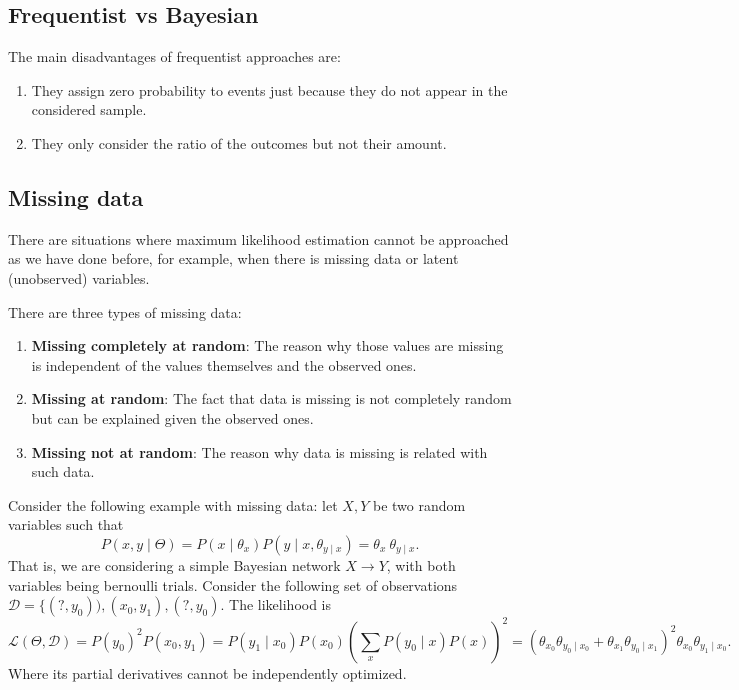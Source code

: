 \documentclass[11pt]{article}
\theoremstyle{definition}
\begin{document}
\subsection{Frequentist vs Bayesian}

The main disadvantages of frequentist approaches are:
\begin{enumerate}
  \item They assign zero probability to events just because they do not appear in the considered sample.
  \item They only consider the ratio of the outcomes but not their amount.
\end{enumerate}

\subsection{Missing data}

There are situations where maximum likelihood estimation cannot be approached as we have done before, for example, when there is missing data or latent (unobserved) variables.

There are three types of missing data:
\begin{enumerate}
  \item \textbf{Missing completely at random}: The reason why those values are missing is independent of the values themselves and the observed ones.
  \item \textbf{Missing at random}: The fact that data is missing is not completely random but can be explained given the observed ones.
  \item \textbf{Missing not at random}: The reason why data is missing is related with such data.
\end{enumerate}

Consider the following example with missing data: let \( X, Y \) be two random variables such that
\[
   P(x, y \mid \Theta) = P(x \mid \theta_x)P(y \mid x, \theta_{y\mid x}) = \theta_x \ \theta_{y\mid x}.
\]
That is, we are considering a simple Bayesian network \( X \to Y \), with both variables being bernoulli trials. Consider the following set of observations \( \mathcal{D} = \{(?, y_0)), (x_0, y_1), (?, y_0) \). The likelihood is
\[
   \mathcal{L}(\Theta, \mathcal{D}) = P(y_0)^2P(x_0, y_1) = P(y_1 \mid x_0)P(x_0)\left(\sum_x P(y_0\mid x)P(x)\right)^2 = (\theta_{x_0}\theta_{y_0 \mid x_0} + \theta_{x_1}\theta_{y_0 \mid x_1} )^2 \theta_{x_0}\theta_{y_1 \mid x_0}.
\]  
Where its partial derivatives cannot be independently optimized. 
\end{document}
